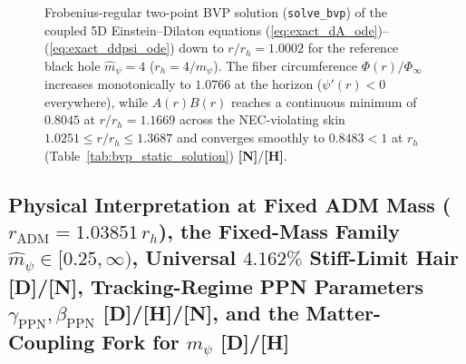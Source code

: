 \documentclass[11pt,a4paper]{article}
\newcommand{\catD}{\textbf{\textcolor{blue!75!black}{[D]}}}
\newcommand{\catH}{\textbf{\textcolor{orange!85!black}{[H]}}}
\newcommand{\catN}{\textbf{\textcolor{teal!75!black}{[N]}}}
\theoremstyle{definition}
\theoremstyle{remark}
\begin{document}
\begin{figure}[H]
  \caption{Frobenius-regular two-point BVP solution (\texttt{solve\_bvp}) of the coupled 5D Einstein--Dilaton equations (\ref{eq:exact_dA_ode})--(\ref{eq:exact_ddpsi_ode}) down to $r/r_h = 1.0002$ for the reference black hole $\hat{m}_{\psi} = 4$ ($r_h = 4/m_{\psi}$). The fiber circumference $\Phi(r)/\Phi_{\infty}$ increases monotonically to $1.0766$ at the horizon ($\psi'(r) < 0$ everywhere), while $A(r)B(r)$ reaches a continuous minimum of $0.8045$ at $r/r_h = 1.1669$ across the NEC-violating skin $1.0251 \le r/r_h \le 1.3687$ and converges smoothly to $0.8483 < 1$ at $r_h$ (Table~\ref{tab:bvp_static_solution}) \catN/\catH.}
  \label{fig:bvp_static_profiles}
\end{figure}

\subsection{\texorpdfstring{Physical Interpretation at Fixed ADM Mass ($r_{\text{ADM}} = 1.03851\,r_h$), the Fixed-Mass Family $\hat{m}_{\psi} \in [0.25, \infty)$, Universal $4.162\%$ Stiff-Limit Hair \catD/\catN, Tracking-Regime PPN Parameters $\gamma_{\text{PPN}}, \beta_{\text{PPN}}$ \catD/\catH/\catN, and the Matter-Coupling Fork for $m_{\psi}$ \catD/\catH}{Physical Interpretation at Fixed ADM Mass, the Fixed-Mass Family, Universal 4.162\% Stiff-Limit Hair, Tracking-Regime PPN Parameters, and the Matter-Coupling Fork}}
\end{document}
